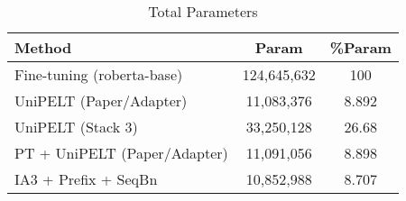 \documentclass[10pt,twocolumn,letterpaper]{article}
\begin{document}
\begin{table}[!htbp]
\small %
\centering
\begin{tabular}{lcc}
\hline
\textbf{Method} & \textbf{Param} & \textbf{\%Param} \\
\hline\hline
Fine-tuning (roberta-base) & 124,645,632 & 100 \\
UniPELT (Paper/Adapter) & 11,083,376 & 8.892 \\
UniPELT (Stack 3) & 33,250,128 & 26.68 \\ %
PT + UniPELT (Paper/Adapter) &  11,091,056 &  8.898 \\
IA3 + Prefix + SeqBn & 10,852,988 & 8.707 \\
\hline
\end{tabular}
\caption{Total Parameters}
  \label{tab:table3}
\end{table}
\end{document}
